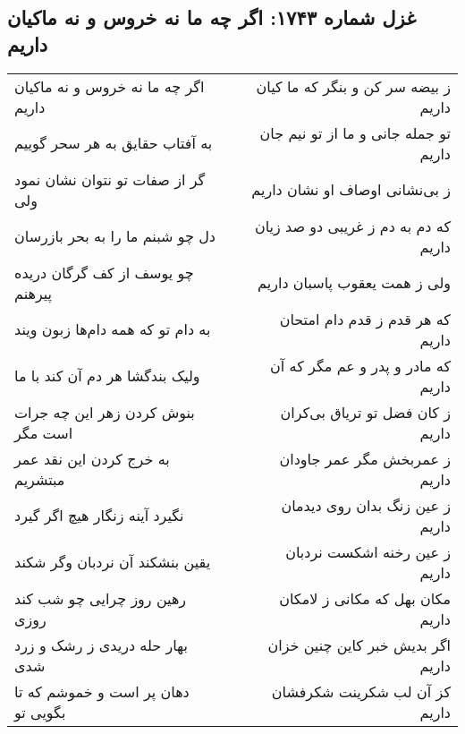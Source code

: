 \begin{center}
\section*{غزل شماره ۱۷۴۳: اگر چه ما نه خروس و نه ماکیان داریم}
\label{sec:1743}
\begin{longtable}{l p{0.5cm} r}
اگر چه ما نه خروس و نه ماکیان داریم
&&
ز بیضه سر کن و بنگر که ما کیان داریم
\\
به آفتاب حقایق به هر سحر گوییم
&&
تو جمله جانی و ما از تو نیم جان داریم
\\
گر از صفات تو نتوان نشان نمود ولی
&&
ز بی‌نشانی اوصاف او نشان داریم
\\
دل چو شبنم ما را به بحر بازرسان
&&
که دم به دم ز غریبی دو صد زیان داریم
\\
چو یوسف از کف گرگان دریده پیرهنم
&&
ولی ز همت یعقوب پاسبان داریم
\\
به دام تو که همه دام‌ها زبون ویند
&&
که هر قدم ز قدم دام امتحان داریم
\\
ولیک بندگشا هر دم آن کند با ما
&&
که مادر و پدر و عم مگر که آن داریم
\\
بنوش کردن زهر این چه جرات است مگر
&&
ز کان فضل تو تریاق بی‌کران داریم
\\
به خرج کردن این نقد عمر مبتشریم
&&
ز عمربخش مگر عمر جاودان داریم
\\
نگیرد آینه زنگار هیچ اگر گیرد
&&
ز عین زنگ بدان روی دیدمان داریم
\\
یقین بنشکند آن نردبان وگر شکند
&&
ز عین رخنه اشکست نردبان داریم
\\
رهین روز چرایی چو شب کند روزی
&&
مکان بهل که مکانی ز لامکان داریم
\\
بهار حله دریدی ز رشک و زرد شدی
&&
اگر بدیش خبر کاین چنین خزان داریم
\\
دهان پر است و خموشم که تا بگویی تو
&&
کز آن لب شکرینت شکرفشان داریم
\\
\end{longtable}
\end{center}
